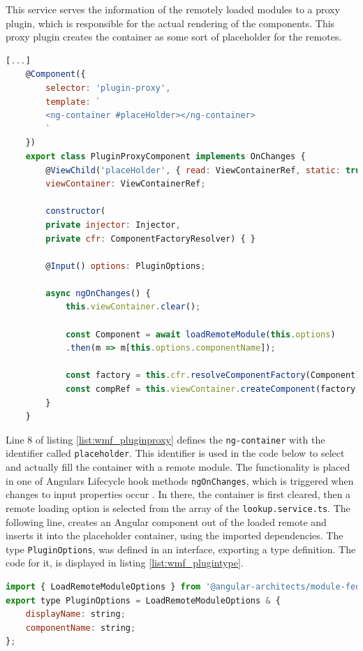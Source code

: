 This service serves the information of the remotely loaded modules to a proxy plugin, which is responsible for the actual rendering of the components. This proxy plugin creates the container as some sort of placeholder for the remotes. \cite{wmf_angular_dynamicfederation}
\newpage
\begin{lstlisting}[language=JavaScript, caption=Content of \texttt{plugin-proxy.component.ts} for remote module loading in shell applications, label=list:wmf_pluginproxy,  xleftmargin=.0\textwidth, xrightmargin=.0\textwidth]
	[...]	
	@Component({
		selector: 'plugin-proxy',
		template: `
		<ng-container #placeHolder></ng-container>
		`
	})
	export class PluginProxyComponent implements OnChanges {
		@ViewChild('placeHolder', { read: ViewContainerRef, static: true })
		viewContainer: ViewContainerRef;
		
		constructor(
		private injector: Injector,
		private cfr: ComponentFactoryResolver) { }
		
		@Input() options: PluginOptions;
		
		async ngOnChanges() {
			this.viewContainer.clear();
			
			const Component = await loadRemoteModule(this.options)
			.then(m => m[this.options.componentName]);
			
			const factory = this.cfr.resolveComponentFactory(Component);
			const compRef = this.viewContainer.createComponent(factory, null, this.injector);		
		}
	}
\end{lstlisting}

Line 8 of listing \ref{list:wmf_pluginproxy} defines the \texttt{ng-container} with the identifier called \texttt{placeholder}. This identifier is used in the code below to select and actually fill the container with a remote module. The functionality is placed in one of Angulars Lifecycle hook methods \texttt{ngOnChanges}, which is triggered when changes to input properties occur \cite{wmf_angular_lifecyclehooks}.
In there, the container is first cleared, then a remote loading option is selected from the array of the \texttt{lookup.service.ts}. The following line, creates an Angular component out of the loaded remote and inserts it into the placeholder container, using the imported dependencies.
The type \texttt{PluginOptions}, was defined in an interface, exporting a type definition. The code for it, is displayed in listing \ref{list:wmf_plugintype}.
\newpage
\begin{lstlisting}[language=JavaScript, caption=Content of \texttt{plugin.ts} for remote module loading in shell applications, label=list:wmf_plugintype,  xleftmargin=.0\textwidth, xrightmargin=.0\textwidth]
import { LoadRemoteModuleOptions } from '@angular-architects/module-federation';
export type PluginOptions = LoadRemoteModuleOptions & {
	displayName: string;
	componentName: string;
};
\end{lstlisting}

